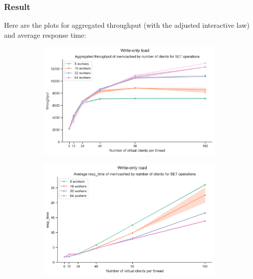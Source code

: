 \documentclass[11pt,a4paper]{article}
\begin{document}
\subsubsection{Result}

Here are the plots for aggregated throughput (with the adjusted interactive law) and average response time:

\begin{figure}[H]
	\begin{subfigure}[b]{0.5\linewidth}
		\includegraphics[width=\linewidth]{images/writes_1/last_graph_set_throughput.pdf}
	\end{subfigure}
	\begin{subfigure}[b]{0.5\linewidth}
		\includegraphics[width=\linewidth]{images/writes_1/last_graph_set_resp_time.pdf}
	\end{subfigure}
	\caption{}
	\label{fig:ohreally}
\end{figure}
\end{document}
